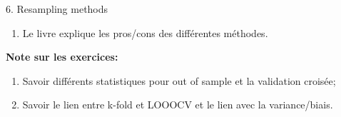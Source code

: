 \documentclass[12pt, titlepage, french]{report}
\begin{document}
\begin{CHPT_SUMM}{6. Resampling methods}
\begin{enumerate}
\begin{enumerate}
\begin{enumerate}
			\item	\textbf{k-fold Cross Validation}: Partitionne les données en k sous-ensembles et en prends la moyenne.
		\end{enumerate}
	\end{enumerate}
	\item	Le livre explique les pros/cons des différentes méthodes.
\end{enumerate}
\textbf{Note sur les exercices:} 
\begin{enumerate}
	\item	Savoir différents statistiques pour out of sample et la validation croisée;
	\item	Savoir le lien entre k-fold et LOOOCV et le lien avec la variance/biais.
\end{enumerate}
\end{CHPT_SUMM}
\end{document}
